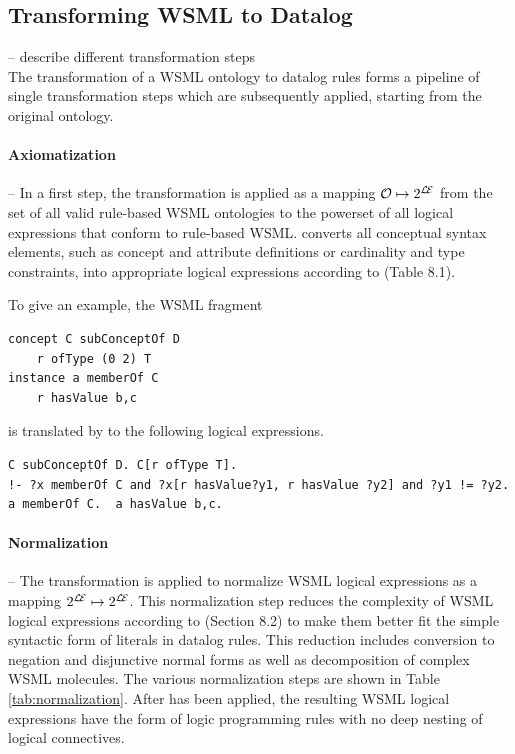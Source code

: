 \subsection{Transforming WSML to Datalog}
-- describe different transformation steps \\

The transformation of a WSML ontology to datalog rules forms a
pipeline of single transformation steps which are subsequently
applied, starting from the original ontology.

\paragraph{Axiomatization} -- In a first step, the transformation
\transax is applied as a mapping $\mathcal{O} \mapsto 2^{\mathcal{L\!E}}$ from
the set of all valid rule-based WSML ontologies to the powerset of
all logical expressions that conform to rule-based WSML. \transax
converts all conceptual syntax elements, such as concept and
attribute definitions or cardinality and type constraints, into
appropriate logical expressions according to
\cite{wsml-spec}(Table 8.1). 

To give an example, the WSML fragment
\begin{lstlisting}[style=wsml]
concept C subConceptOf D
    r ofType (0 2) T
instance a memberOf C
    r hasValue b,c
\end{lstlisting}
is translated by \transax to the following logical expressions.
\begin{lstlisting}[style=wsml]
C subConceptOf D. C[r ofType T].
!- ?x memberOf C and ?x[r hasValue?y1, r hasValue ?y2] and ?y1 != ?y2.
a memberOf C.  a hasValue b,c.
\end{lstlisting}

\paragraph{Normalization} -- The transformation \transnorm is
applied to normalize WSML logical expressions as a mapping
$2^{\mathcal{L\!E}} \mapsto 2^{\mathcal{L\!E}}$. This normalization step
reduces the complexity of WSML logical expressions according to
\cite{wsml-spec}(Section 8.2) to make them better fit the simple
syntactic form of literals in datalog rules. This reduction
includes conversion to negation and disjunctive normal forms as
well as decomposition of complex WSML molecules. The various
normalization steps are shown in Table \ref{tab:normalization}.
 After \transnorm has
been applied, the resulting WSML logical expressions have the form
of logic programming rules with no deep nesting of logical
connectives.

